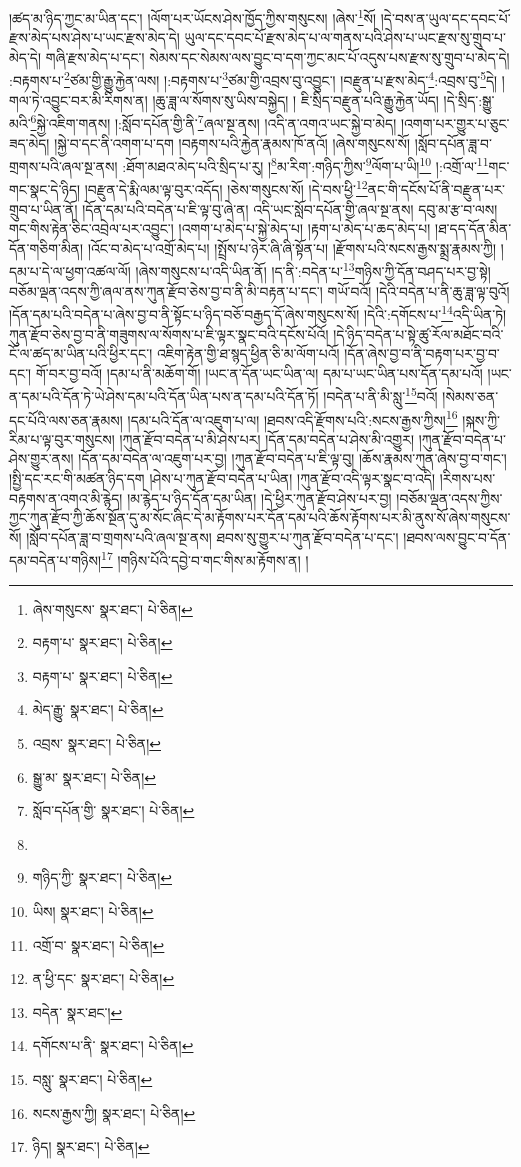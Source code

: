 །ཚད་མ་ཉིད་ཀྱང་མ་ཡིན་དང་། །ལོག་པར་ཡོངས་ཤེས་ཁྱོད་ཀྱིས་གསུངས། །ཞེས་\footnote{ཞེས་གསུངས་  སྣར་ཐང་།  པེ་ཅིན། }སོ། །དེ་བས་ན་ཡུལ་དང་དབང་པོ་རྫས་མེད་པས་ཤེས་པ་ཡང་རྫས་མེད་དེ། ཡུལ་དང་དབང་པོ་རྫས་མེད་པ་ལ་གནས་པའི་ཤེས་པ་ཡང་རྫས་སུ་གྲུབ་པ་མེད་དེ། གཞི་རྫས་མེད་པ་དང་། སེམས་དང་སེམས་ལས་བྱུང་བ་དག་ཀྱང་མང་པོ་འདུས་པས་རྫས་སུ་གྲུབ་པ་མེད་དེ། :བརྟགས་པ་\footnote{བརྟག་པ་  སྣར་ཐང་།  པེ་ཅིན། }ཙམ་གྱི་རྒྱུ་རྐྱེན་ལས། །:བརྟགས་པ་\footnote{བརྟག་པ་  སྣར་ཐང་།  པེ་ཅིན། }ཙམ་གྱི་འབྲས་བུ་འབྱུང་། །བརྫུན་པ་རྫས་མེད་\footnote{མེད་རྒྱུ་  སྣར་ཐང་།  པེ་ཅིན། }:འབྲས་བུ་\footnote{འབྲས་  སྣར་ཐང་།  པེ་ཅིན། }དེ། །གལ་ཏེ་འབྱུང་བར་མི་རིགས་ན། །ཆུ་ཟླ་ལ་སོགས་སུ་ཡིས་བསྐྱེད། །
ཇི་སྲིད་བརྫུན་པའི་རྒྱུ་རྐྱེན་ཡོད། །དེ་སྲིད་:སྒྱུ་མའི་\footnote{སྒྱུ་མ་  སྣར་ཐང་།  པེ་ཅིན། }སྐྱེ་འཇིག་གནས། །:སློབ་དཔོན་གྱི་ནི་\footnote{སློབ་དཔོན་གྱི་  སྣར་ཐང་།  པེ་ཅིན། }ཞལ་སྔ་ནས། །འདི་ན་འགའ་ཡང་སྐྱེ་བ་མེད། །འགག་པར་གྱུར་པ་ཅུང་ཟད་མེད། །སྐྱེ་བ་དང་ནི་འགག་པ་དག །བརྟགས་པའི་རྐྱེན་རྣམས་ཁོ་ནའོ། །ཞེས་གསུངས་སོ། །སློབ་དཔོན་ཟླ་བ་གྲགས་པའི་ཞལ་སྔ་ནས། :ཐོག་མཐའ་མེད་པའི་སྲིད་པ་རུ། །\footnote{}མ་རིག་:གཉིད་ཀྱིས་\footnote{གཉིད་ཀྱི་  སྣར་ཐང་།  པེ་ཅིན། }ལོག་པ་ཡི།\footnote{ཡིས།  སྣར་ཐང་།  པེ་ཅིན། } །:འགྲོ་ལ་\footnote{འགྲོ་བ་  སྣར་ཐང་།  པེ་ཅིན། }གང་གང་སྣང་དེ་ཉིད། །བརྫུན་དེ་རྨི་ལམ་ལྟ་བུར་འདོད། །ཅེས་གསུངས་སོ། །དེ་བས་ཕྱི་\footnote{ན་ཕྱི་དང་  སྣར་ཐང་།  པེ་ཅིན། }ནང་གི་དངོས་པོ་ནི་བརྫུན་པར་གྲུབ་པ་ཡིན་ནོ། །དོན་དམ་པའི་བདེན་པ་ཇི་ལྟ་བུ་ཞེ་ན། འདི་ཡང་སློབ་དཔོན་གྱི་ཞལ་སྔ་ནས། དབུ་མ་རྩ་བ་ལས། གང་གིས་རྟེན་ཅིང་འབྲེལ་པར་འབྱུང་། །འགག་པ་མེད་པ་སྐྱེ་མེད་པ། །རྟག་པ་མེད་པ་ཆད་མེད་པ། །ཐ་དད་དོན་མིན་དོན་གཅིག་མིན། །འོང་བ་མེད་པ་འགྲོ་མེད་པ། །སྤྲོས་པ་ཉེར་ཞི་ཞི་སྟོན་པ། །རྫོགས་པའི་སངས་རྒྱས་སྨྲ་རྣམས་ཀྱི། །དམ་པ་དེ་ལ་ཕྱག་འཚལ་ལོ། །ཞེས་གསུངས་པ་འདི་ཡིན་ནོ། །ད་ནི་:བདེན་པ་\footnote{བདེན་  སྣར་ཐང་། }གཉིས་ཀྱི་དོན་བཤད་པར་བྱ་སྟེ། བཅོམ་ལྡན་འདས་ཀྱི་ཞལ་ནས་ཀུན་རྫོབ་ཅེས་བྱ་བ་ནི་མི་བརྟན་པ་དང་། གཡོ་བའོ། །དེའི་བདེན་པ་ནི་ཆུ་ཟླ་ལྟ་བུའོ། །དོན་དམ་པའི་བདེན་པ་ཞེས་བྱ་བ་ནི་སྟོང་པ་ཉིད་བཅོ་བརྒྱད་དོ་ཞེས་གསུངས་སོ། །དེའི་:དགོངས་པ་\footnote{དགོངས་པ་ནི་  སྣར་ཐང་།  པེ་ཅིན། }འདི་ཡིན་ཏེ། ཀུན་རྫོབ་ཅེས་བྱ་བ་ནི་གཟུགས་ལ་སོགས་པ་ཇི་ལྟར་སྣང་བའི་དངོས་པོའོ། །དེ་ཉིད་བདེན་པ་སྟེ་ཚུ་རོལ་མཐོང་བའི་ངོ་ལ་ཚད་མ་ཡིན་པའི་ཕྱིར་དང་། འཇིག་རྟེན་གྱི་ཐ་སྙད་ཕྱིན་ཅི་མ་ལོག་པའོ། །དོན་ཞེས་བྱ་བ་ནི་བརྟག་པར་བྱ་བ་དང་། གོ་བར་བྱ་བའོ། །དམ་པ་ནི་མཆོག་གོ། །ཡང་ན་དོན་ཡང་ཡིན་ལ། དམ་པ་ཡང་ཡིན་པས་དོན་དམ་པའོ། །ཡང་ན་དམ་པའི་དོན་ཏེ་ཡེ་ཤེས་དམ་པའི་དོན་ཡིན་པས་ན་དམ་པའི་དོན་ཏོ། །བདེན་པ་ནི་མི་སླུ་\footnote{བསླུ་  སྣར་ཐང་།  པེ་ཅིན། }བའོ། །སེམས་ཅན་དང་པོའི་ལས་ཅན་རྣམས། །དམ་པའི་དོན་ལ་འཇུག་པ་ལ། །ཐབས་འདི་རྫོགས་པའི་:སངས་རྒྱས་ཀྱིས།\footnote{སངས་རྒྱས་ཀྱི།  སྣར་ཐང་།  པེ་ཅིན། } །སྐས་ཀྱི་རིམ་པ་ལྟ་བུར་གསུངས། །ཀུན་རྫོབ་བདེན་པ་མི་ཤེས་པར། །དོན་དམ་བདེན་པ་ཤེས་མི་འགྱུར། །ཀུན་རྫོབ་བདེན་པ་ཤེས་གྱུར་ནས། །དོན་དམ་བདེན་ལ་འཇུག་པར་བྱ། །ཀུན་རྫོབ་བདེན་པ་ཇི་ལྟ་བུ། །ཆོས་རྣམས་ཀུན་ཞེས་བྱ་བ་གང་། །སྤྱི་དང་རང་གི་མཚན་ཉིད་དག །ཤེས་པ་ཀུན་རྫོབ་བདེན་པ་ཡིན། །ཀུན་རྫོབ་འདི་ལྟར་སྣང་བ་འདི། །རིགས་པས་བརྟགས་ན་འགའ་མི་རྙེད། །མ་རྙེད་པ་ཉིད་དོན་དམ་ཡིན། །དེ་ཕྱིར་ཀུན་རྫོབ་ཤེས་པར་བྱ། །བཅོམ་ལྡན་འདས་ཀྱིས་ཀྱང་ཀུན་རྫོབ་ཀྱི་ཆོས་སྔོན་དུ་མ་སོང་ཞིང་དེ་མ་རྟོགས་པར་དོན་དམ་པའི་ཆོས་རྟོགས་པར་མི་ནུས་སོ་ཞེས་གསུངས་སོ། །སློབ་དཔོན་ཟླ་བ་གྲགས་པའི་ཞལ་སྔ་ནས། ཐབས་སུ་གྱུར་པ་ཀུན་རྫོབ་བདེན་པ་དང་། །ཐབས་ལས་བྱུང་བ་དོན་དམ་བདེན་པ་གཉིས།\footnote{ཉིད།  སྣར་ཐང་།  པེ་ཅིན། } །གཉིས་པོའི་དབྱེ་བ་གང་གིས་མ་རྟོགས་ན། །
